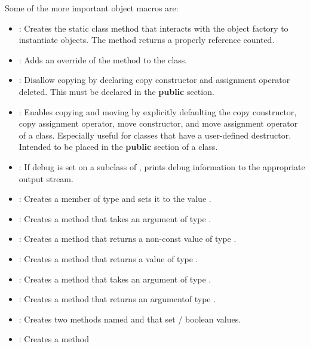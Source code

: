 Some of the more important object macros are:
\begin{itemize}
\item {}: Creates the static class method 
that interacts with the object factory to instantiate objects. The method
returns a  properly reference counted.
\item {}: Adds an override of
the  method to the class.
\item {}: Disallow copying by
declaring copy constructor and assignment operator deleted. This must be
declared in the \textbf{public} section.
\item {}: Enables copying and moving
by explicitly defaulting the copy constructor, copy assignment operator, move
constructor, and move assignment operator of a class. Especially useful for
classes that have a user-defined destructor. Intended to be placed in the
\textbf{public} section of a class.
\item {}: If debug is set on a subclass of
, prints debug information to the appropriate output
stream.
\item {}: Creates a
 member of type  and sets it to the value
.
\item {}: Creates a method  that
takes an argument of type .
\item {}: Creates a method  that
returns a non-const value of type .
\item {}: Creates a method 
that returns a  value of type .
\item {}: Creates a method  that
takes an argument of type .
\item {}: Creates a method  that
returns an argumentof  type .
\item {}: Creates two methods named  and
 that set / boolean values.
\item {}: Creates a method 

\end{itemize}
